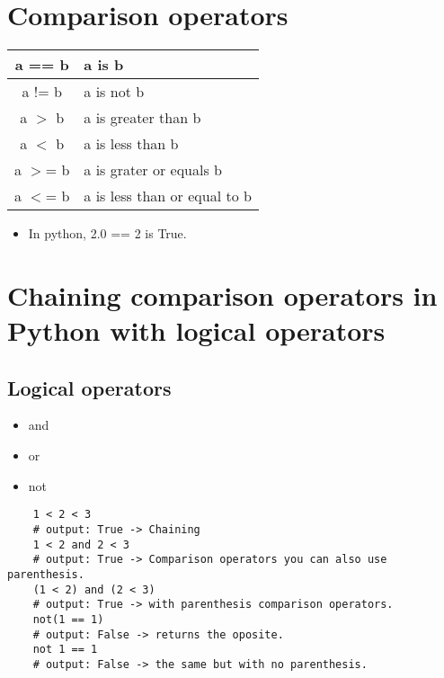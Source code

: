 \section{Comparison operators}
\begin{center}
    \begin{tabular}{ |c|l| }
        \hline
            a == b & a is b \\
        \hline
            a != b & a is not b \\ 
        \hline
            a $>$ b & a is greater than b \\ 
        \hline
            a $<$ b & a is less than b \\ 
        \hline
            a $>$= b & a is grater or equals b \\ 
        \hline
            a $<$= b & a is less than or equal to b \\ 
        \hline
    \end{tabular}
\end{center}
\begin{itemize}
    \item In python, 2.0 == 2 is True. 
\end{itemize}


\section{Chaining comparison operators in Python with logical operators}
\subsection{Logical operators}
\begin{itemize}
    \item and
    \item or 
    \item not
\end{itemize}
\begin{verbatim}
    1 < 2 < 3 
    # output: True -> Chaining
    1 < 2 and 2 < 3 
    # output: True -> Comparison operators you can also use parenthesis.
    (1 < 2) and (2 < 3) 
    # output: True -> with parenthesis comparison operators. 
    not(1 == 1) 
    # output: False -> returns the oposite.
    not 1 == 1  
    # output: False -> the same but with no parenthesis.
\end{verbatim}
